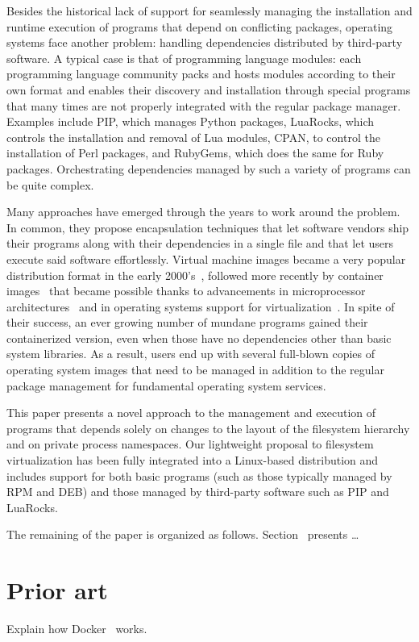 \documentclass[sigplan, anonymous]{acmart}
\begin{document}
Besides the historical lack of support for seamlessly managing the installation and runtime
execution of programs that depend on conflicting packages, operating systems face another problem:
handling dependencies distributed by third-party software. A typical case is that of programming
language modules: each programming language community packs and hosts modules according to their own
format and enables their discovery and installation through special programs that many times are not
properly integrated with the regular package manager. Examples include PIP, which manages Python
packages, LuaRocks, which controls the installation and removal of Lua modules, CPAN, to control the
installation of Perl packages, and RubyGems, which does the same for Ruby packages. Orchestrating
dependencies managed by such a variety of programs can be quite complex.

Many approaches have emerged through the years to work around the problem. In common, they propose
encapsulation techniques that let software vendors ship their programs along with their dependencies
in a single file and that let users execute said software effortlessly. Virtual machine images
became a very popular distribution format in the early 2000's~\cite{Who?}, followed more recently by
container images~\cite{fink2014docker} that became possible thanks to advancements in microprocessor
architectures~\cite{Intel} and in operating systems support for virtualization~\cite{KVM}. In spite
of their success, an ever growing number of mundane programs gained their containerized version,
even when those have no dependencies other than basic system libraries. As a result, users end up
with several full-blown copies of operating system images that need to be managed in addition to
the regular package management for fundamental operating system services.

This paper presents a novel approach to the management and execution of programs that depends
solely on changes to the layout of the filesystem hierarchy and on private process namespaces.
Our lightweight proposal to filesystem virtualization has been fully integrated into a Linux-based
distribution and includes support for both basic programs (such as those typically managed by RPM
and DEB) and those managed by third-party software such as PIP and LuaRocks.

The remaining of the paper is organized as follows. Section~ presents \ldots

\section{Prior art}
Explain how Docker~\cite{fink2014docker} works.
\end{document}

